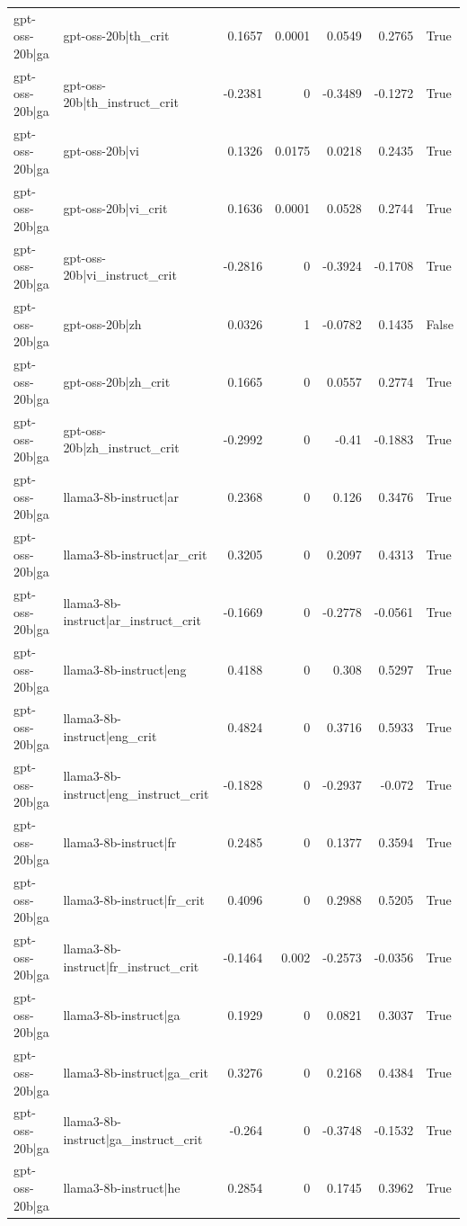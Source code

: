 \begin{table}
\begin{tabular}{l l r r r r l}
gpt-oss-20b|ga & gpt-oss-20b|th_crit & 0.1657 & 0.0001 & 0.0549 & 0.2765 & True \\
gpt-oss-20b|ga & gpt-oss-20b|th_instruct_crit & -0.2381 & 0 & -0.3489 & -0.1272 & True \\
gpt-oss-20b|ga & gpt-oss-20b|vi & 0.1326 & 0.0175 & 0.0218 & 0.2435 & True \\
gpt-oss-20b|ga & gpt-oss-20b|vi_crit & 0.1636 & 0.0001 & 0.0528 & 0.2744 & True \\
gpt-oss-20b|ga & gpt-oss-20b|vi_instruct_crit & -0.2816 & 0 & -0.3924 & -0.1708 & True \\
gpt-oss-20b|ga & gpt-oss-20b|zh & 0.0326 & 1 & -0.0782 & 0.1435 & False \\
gpt-oss-20b|ga & gpt-oss-20b|zh_crit & 0.1665 & 0 & 0.0557 & 0.2774 & True \\
gpt-oss-20b|ga & gpt-oss-20b|zh_instruct_crit & -0.2992 & 0 & -0.41 & -0.1883 & True \\
gpt-oss-20b|ga & llama3-8b-instruct|ar & 0.2368 & 0 & 0.126 & 0.3476 & True \\
gpt-oss-20b|ga & llama3-8b-instruct|ar_crit & 0.3205 & 0 & 0.2097 & 0.4313 & True \\
gpt-oss-20b|ga & llama3-8b-instruct|ar_instruct_crit & -0.1669 & 0 & -0.2778 & -0.0561 & True \\
gpt-oss-20b|ga & llama3-8b-instruct|eng & 0.4188 & 0 & 0.308 & 0.5297 & True \\
gpt-oss-20b|ga & llama3-8b-instruct|eng_crit & 0.4824 & 0 & 0.3716 & 0.5933 & True \\
gpt-oss-20b|ga & llama3-8b-instruct|eng_instruct_crit & -0.1828 & 0 & -0.2937 & -0.072 & True \\
gpt-oss-20b|ga & llama3-8b-instruct|fr & 0.2485 & 0 & 0.1377 & 0.3594 & True \\
gpt-oss-20b|ga & llama3-8b-instruct|fr_crit & 0.4096 & 0 & 0.2988 & 0.5205 & True \\
gpt-oss-20b|ga & llama3-8b-instruct|fr_instruct_crit & -0.1464 & 0.002 & -0.2573 & -0.0356 & True \\
gpt-oss-20b|ga & llama3-8b-instruct|ga & 0.1929 & 0 & 0.0821 & 0.3037 & True \\
gpt-oss-20b|ga & llama3-8b-instruct|ga_crit & 0.3276 & 0 & 0.2168 & 0.4384 & True \\
gpt-oss-20b|ga & llama3-8b-instruct|ga_instruct_crit & -0.264 & 0 & -0.3748 & -0.1532 & True \\
gpt-oss-20b|ga & llama3-8b-instruct|he & 0.2854 & 0 & 0.1745 & 0.3962 & True \\

\end{tabular}
\end{table}
